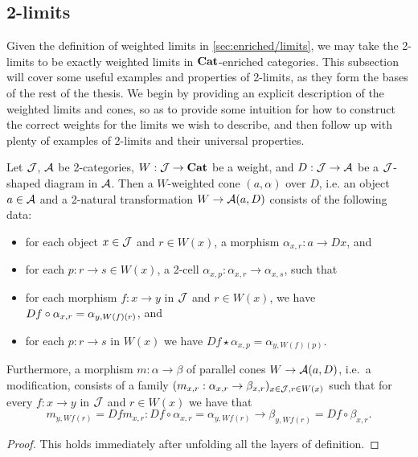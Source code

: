 \documentclass[../thesis.tex]{subfiles}
\begin{document}
\subsection{2-limits}
Given the definition of weighted limits in \cref{sec:enriched/limits}, we may take the 2-limits to be exactly weighted limits
in ${\mathbf{Cat}}$-enriched categories. This subsection will cover some useful examples and properties of 2-limits, as they form the
bases of the rest of the thesis. We begin by providing an explicit description of the weighted limits and cones, so as to
provide some intuition for how to construct the correct weights for the limits we wish to describe, and then follow up with
plenty of examples of 2-limits and their universal properties.

\begin{proposition}
  Let ${\mathcal{J}}$, ${\mathcal{A}}$ be 2-categories, $W : {\mathcal{J}} \to {\mathbf{Cat}}$ be a weight, and $D : {\mathcal{J}} \to {\mathcal{A}}$ be a ${\mathcal{J}}$-shaped diagram in ${\mathcal{A}}$.
  Then a $W$-weighted cone $(a,\alpha)$ over $D$, i.e. an object $a \in {\mathcal{A}}$ and a 2-natural transformation $W \to {\mathcal{A}}(a,D)$
  consists of the following data:
  \begin{itemize}
    \item for each object $x \in {\mathcal{J}}$ and $r \in W(x)$, a morphism $\alpha_{x,r} : a \to Dx$,
      and
    \item for each $p : r \to s \in W(x)$, a 2-cell $\alpha_{x,p} : \alpha_{x,r} \to \alpha_{x,s}$,
      such that
    \item for each morphism $f : x \to y$ in ${\mathcal{J}}$ and $r \in W(x)$, we have $Df \circ \alpha_%
      {x,r} = \alpha_{y,W(f)(r)}$, and
    \item for each $p : r \to s$ in $W(x)$ we have $Df \star \alpha_{x,p} = \alpha_{y,W(f)(p)}$.
  \end{itemize} 

  Furthermore, a morphism $m : \alpha \to \beta$ of parallel cones $W \to {\mathcal{A}}(a,D)$, i.e.\ a modification,
  consists of a family $(m_{x,r} : \alpha_{x,r} \to \beta_{x,r})_{x \in {\mathcal{J}}, r \in W(x)}$ such that for every
  $f : x \to y$ in ${\mathcal{J}}$  and $r \in W(x)$ we have that
  \[m_{y,Wf(r)} = Df m_{x,r} : Df \circ \alpha_{x,r} = \alpha_{y,Wf(r)} \to \beta_{y,Wf(r)}
  = Df \circ \beta_{x,r}.\]
\end{proposition}
\begin{proof}
  This holds immediately after unfolding all the layers of definition.
\end{proof}
\end{document}
